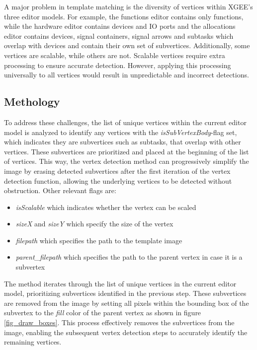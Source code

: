 A major problem in template matching is the diversity of vertices within XGEE's three editor models. For example, the functions editor contains only functions, while the hardware editor contains devices and IO ports and the allocations editor contains devices, signal containers, signal arrows and subtasks which overlap with devices and contain their own set of subvertices. Additionally, some vertices are scalable, while others are not. Scalable vertices require extra processing to ensure accurate detection. However, applying this processing universally to all vertices would result in unpredictable and incorrect detections.

\subsection{Methology}
To address these challenges, the list of unique vertices within the current editor model is analyzed to identify any vertices with the \textit{isSubVertexBody}-flag set, which indicates they are subvertices such as subtasks, that overlap with other vertices. These subvertices are prioritized and placed at the beginning of the list of vertices. This way, the vertex detection method can progressively simplify the image by erasing detected subvertices after the first iteration of the vertex detection function, allowing the underlying vertices to be detected without obstruction. Other relevant flags are: 
\begin{itemize}
    \item \textit{isScalable} which indicates whether the vertex can be scaled
    \item \textit{sizeX} and \textit{sizeY} which specify the size of the vertex
    \item \textit{filepath} which specifies the path to the template image
    \item \textit{parent\_filepath} which specifies the path to the parent vertex in case it is a subvertex
\end{itemize}
The method iterates through the list of unique vertices in the current editor model, prioritizing subvertices identified in the previous step. These subvertices are removed from the image by setting all pixels within the bounding box of the subvertex to the \textit{fill} color of the parent vertex as shown in figure \ref{fig_draw_boxes}. This process effectively removes the subvertices from the image, enabling the subsequent vertex detection steps to accurately identify the remaining vertices.\\
